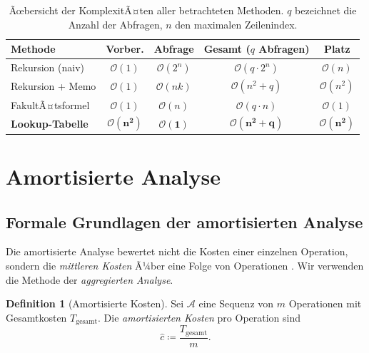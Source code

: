 ﻿\documentclass[12pt, a4paper]{article}
\newcommand{\Oh}{\mathcal{O}}
\theoremstyle{plain}
\theoremstyle{definition}
\newtheorem{definition}[theorem]{Definition}
\theoremstyle{remark}
\renewcommand{\Oh}{\mathcal{O}}
\begin{document}
\begin{table}[H]
  \centering
  \caption{Ãœbersicht der KomplexitÃ¤ten aller betrachteten Methoden.
    $q$ bezeichnet die Anzahl der Abfragen, $n$ den maximalen Zeilenindex.}
  \label{tab:komplexitaeten}
  \begin{tabular}{lcccc}
    \toprule
    \textbf{Methode} & \textbf{Vorber.} & \textbf{Abfrage} &
    \textbf{Gesamt ($q$ Abfragen)} & \textbf{Platz} \\
    \midrule
    Rekursion (naiv) & $\Oh(1)$ & $\Oh(2^n)$ & $\Oh(q \cdot 2^n)$ & $\Oh(n)$ \\
    Rekursion + Memo & $\Oh(1)$ & $\Oh(nk)$ & $\Oh(n^2 + q)$ & $\Oh(n^2)$ \\
    FakultÃ¤tsformel  & $\Oh(1)$ & $\Oh(n)$  & $\Oh(q \cdot n)$   & $\Oh(1)$ \\
    \textbf{Lookup-Tabelle} & $\mathbf{\Oh(n^2)}$ & $\mathbf{\Oh(1)}$ &
    $\mathbf{\Oh(n^2 + q)}$ & $\mathbf{\Oh(n^2)}$ \\
    \bottomrule
  \end{tabular}
\end{table}


\section{Amortisierte Analyse}
\label{sec:amortisiert}

\subsection{Formale Grundlagen der amortisierten Analyse}

Die amortisierte Analyse bewertet nicht die Kosten einer einzelnen
Operation, sondern die \emph{mittleren Kosten} Ã¼ber eine Folge von
Operationen \cite{cormen2009introduction}. Wir verwenden die Methode
der \emph{aggregierten Analyse}.

\begin{definition}[Amortisierte Kosten]
  Sei $\mathcal{A}$ eine Sequenz von $m$ Operationen mit Gesamtkosten
  $T_{\text{gesamt}}$. Die \emph{amortisierten Kosten} pro Operation sind
  \begin{equation}
    \hat{c} \coloneqq \frac{T_{\text{gesamt}}}{m}.
  \end{equation}
\end{definition}
\end{document}
